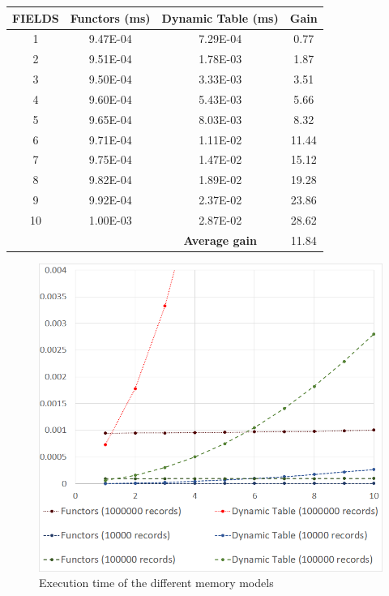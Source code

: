 \begin{table}
	\vspace{0.15cm}
	\begin{tabular}{|c|c|c|c|}
		\hline
		\textbf{FIELDS}& \textbf{Functors (ms)}&\textbf{Dynamic Table (ms)} & \textbf{Gain}\\ \hline
		1&	9.47E-04&	7.29E-04&	0.77\\ \hline
		2&	9.51E-04&	1.78E-03&	1.87\\ \hline
		3&	9.50E-04&	3.33E-03&	3.51\\ \hline
		4&	9.60E-04&	5.43E-03&	5.66\\ \hline
		5&	9.65E-04&	8.03E-03&	8.32\\ \hline
		6&	9.71E-04&	1.11E-02&	11.44\\ \hline
		7&	9.75E-04&	1.47E-02&	15.12\\ \hline
		8&	9.82E-04&	1.89E-02&	19.28\\ \hline
		9&	9.92E-04&	2.37E-02&	23.86\\ \hline
		10&	1.00E-03&	2.87E-02&	28.62\\ \hline
		\multicolumn{2}{c|}{} & \textbf{Average gain} & 11.84\\ \cline{3-4}						
	\end{tabular}
	\label{tab:ch_functors_results}
\end{table}

\begin{figure}
	\includegraphics[width = \textwidth]{Figures/chapter_functors/functor_chart}
	\caption{Execution time of the different memory models}
	\label{fig:ch_functors_chart}
\end{figure}

